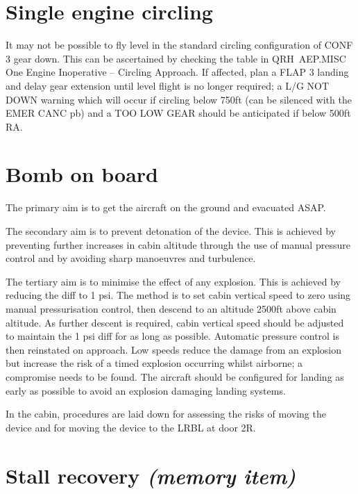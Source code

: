 \documentclass[a5paper,11pt,twoside]{book}
\newcommand{\multicite}[1]{
  \nopagebreak
  \noindent{\footnotesize\color{blue}{[ #1 ]}}
}
\begin{document}
\multicite{FCTM PRO.AEP.ENG.EFDC}
\section{Single engine circling}

It may not be possible to fly level in the standard circling configuration of
CONF 3 gear down. This can be ascertained by checking the table in QRH AEP.MISC
One Engine Inoperative – Circling Approach. If affected, plan a FLAP 3 landing
and delay gear extension until level flight is no longer required; a L/G NOT
DOWN warning which will occur if circling below 750ft (can be silenced with the
EMER CANC pb) and a TOO LOW GEAR should be anticipated if below 500ft RA.

\multicite{QRH AEP.MISC}

\section{Bomb on board}

The primary aim is to get the aircraft on the ground and evacuated ASAP.

The secondary aim is to prevent detonation of the device. This is achieved by
preventing further increases in cabin altitude through the use of manual
pressure control and by avoiding sharp manoeuvres and turbulence.

The tertiary aim is to minimise the effect of any explosion. This is achieved by
reducing the diff to 1 psi. The method is to set cabin vertical speed to zero
using manual pressurisation control, then descend to an altitude 2500ft above
cabin altitude. As further descent is required, cabin vertical speed should be
adjusted to maintain the 1 psi diff for as long as possible. Automatic pressure
control is then reinstated on approach. Low speeds reduce the damage from an
explosion but increase the risk of a timed explosion occurring whilst airborne;
a compromise needs to be found. The aircraft should be configured for landing as
early as possible to avoid an explosion damaging landing systems.

In the cabin, procedures are laid down for assessing the risks of moving the
device and for moving the device to the LRBL at door 2R.

\multicite{QRH AER.80, FCOM PRO.AER.MISC}

\section{Stall recovery \emph{(memory item)}}
\end{document}
